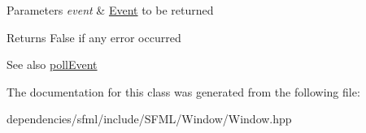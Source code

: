 \begin{DoxyParams}{Parameters}
{\em event} & \hyperlink{classsf_1_1_event}{Event} to be returned\\
\hline
\end{DoxyParams}
\begin{DoxyReturn}{Returns}
False if any error occurred
\end{DoxyReturn}
\begin{DoxySeeAlso}{See also}
\hyperlink{classsf_1_1_window_a338e996585faf82e93069858e3b531b7}{poll\+Event} 
\end{DoxySeeAlso}


The documentation for this class was generated from the following file\+:\begin{DoxyCompactItemize}
\item 
dependencies/sfml/include/\+S\+F\+M\+L/\+Window/Window.\+hpp\end{DoxyCompactItemize}
